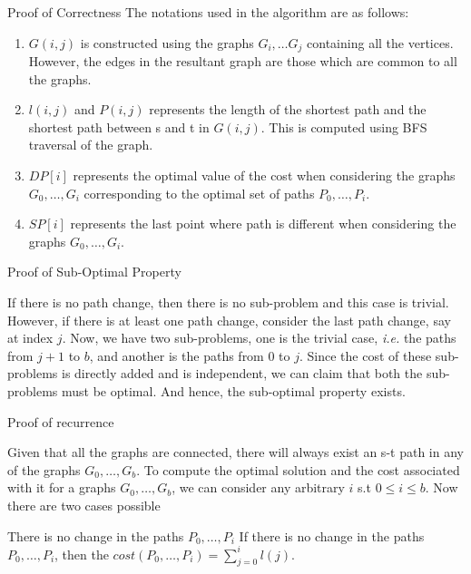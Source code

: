 \documentclass{article}
\begin{document}
\begin{question}
	\begin{qsection}{Proof of Correctness}
		The notations used in the algorithm are as follows:

		\begin{enumerate}
			\item $G(i,j)$ is constructed using the graphs $G_i, \dots G_j$ containing all the vertices. However, the edges in the resultant graph are those which are common to all the graphs.
			\item $l(i,j)$ and $P(i,j)$ represents the length of the shortest path and the shortest path between s and t in $G(i,j)$. This is computed using BFS traversal of the graph.
			\item $DP[i]$ represents the optimal value of the cost when considering the graphs $G_0, \dots , G_i$ corresponding to the optimal set of paths $P_0, \dots , P_i$.
			\item $SP[i]$ represents the last point where path is different when considering the graphs $G_0, \dots , G_i$.
		\end{enumerate}

		\begin{qsubsection}{Proof of Sub-Optimal Property}

			If there is no path change, then there is no sub-problem and this case is trivial. However, if there is at least one path change, consider the last path change, say at index $j$. Now, we have two sub-problems, one is the trivial case, \textit{i.e.} the paths from $j + 1$ to $b$, and another is the paths from $0$ to $j$. Since the cost of these sub-problems is directly added and is independent, we can claim that both the sub-problems must be optimal. And hence, the sub-optimal property exists.
			
		\end{qsubsection}

		\begin{qsubsection}{Proof of recurrence}

			Given that all the graphs are connected, there will always exist an s-t path in any of the graphs $G_0, \dots, G_b$. To compute the optimal solution and the cost associated with it for a graphs $G_0, \dots, G_b$, we can consider any arbitrary $i$ s.t $0 \leq i \leq b$. Now there are two cases possible \br%

			\begin{qcase}{1}{There is no change in the paths $P_0, \dots, P_i$}
				If there is no change in the paths $P_0, \dots , P_i$, then the $cost(P_0, \dots , P_i) = \sum_{j=0}^i l(j)$. \br%
				

\end{qcase}
\end{qsubsection}
\end{qsection}
\end{question}
\end{document}
